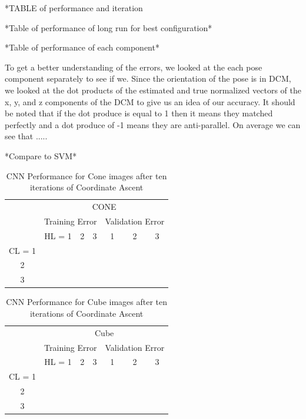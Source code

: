 \documentclass[journal]{IEEEtran}
\begin{document}
*TABLE of performance and iteration

*Table of performance of long run for best configuration*

*Table of performance of each component*

To get a better understanding of the errors, we looked at the each pose component separately to see if we. Since the orientation of the pose is in DCM, we looked at the dot products of the estimated  and true normalized vectors of the x, y, and z components of the DCM to give us an idea of our accuracy. It should be noted that if the dot produce is equal to 1 then it means they matched perfectly and a dot produce of -1 means they are anti-parallel. On average we can see that  .....

*Compare to SVM*

\begin{table}[h]
	\caption{CNN Performance for Cone images after ten iterations of Coordinate Ascent}
	\label{CNN_CONE_TABLE}
	\centering
	\begin{tabular}{|c|c|c|c||c|c|c|}
		\cline{2-7}
		\multicolumn{1}{c|}{} &	\multicolumn{6}{c|}{CONE}\\\cline{2-7}
		\multicolumn{1}{c|}{}&\multicolumn{3}{|c||}{Training Error}  &\multicolumn{3}{c|}{Validation Error} \\
		\cline{2-7}
		\multicolumn{1}{c|}{} & HL = 1 & 2 & 3 &1 & 2 & 3 \\
		\hline
		CL = 1	& & & 	& & & \\
		2	& & & & & & \\
		3	& & & & &  & \\
		\hline
		
		
	\end{tabular}
\end{table}

\begin{table}[h]
	\caption{CNN Performance for Cube images after ten iterations of Coordinate Ascent}
	\label{CNN_CUBE_TABLE}
	\centering
	\begin{tabular}{|c|c|c|c||c|c|c|}
		\cline{2-7}
		\multicolumn{1}{c|}{} &	\multicolumn{6}{c|}{Cube}\\\cline{2-7}
		\multicolumn{1}{c|}{}&\multicolumn{3}{|c||}{Training Error}  &\multicolumn{3}{c|}{Validation Error} \\
		\cline{2-7}
		\multicolumn{1}{c|}{} & HL = 1 & 2 & 3 &1 & 2 & 3 \\
		\hline
		CL = 1	& & & 	& & & \\
		2	& & & & & & \\
		3	& & & & &  & \\
		\hline
		
		
	\end{tabular}
\end{table}
\end{document}
